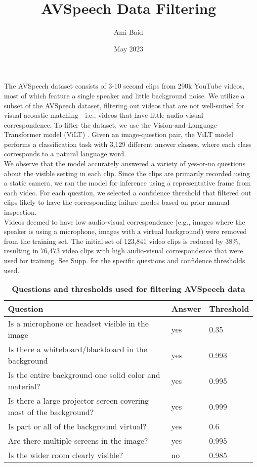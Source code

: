 \documentclass{article}
\title{\textbf{AVSpeech Data Filtering}}
\author{Ami Baid}
\date{May 2023}
\begin{document}
\maketitle

\begin{flushleft}
    \large
    The AVSpeech dataset \cite{DBLP:journals/corr/abs-1804-03619} consists of 3-10 second clips from 290k YouTube videos, most of which feature a single speaker and little background noise. We utilize a subset of the AVSpeech dataset, filtering out videos that are not well-suited for visual acoustic matching—i.e., videos that have little audio-visual correspondence. To filter the dataset, we use the Vision-and-Language Transformer model (ViLT) \cite{kim2021vilt}. Given an image-question pair, the ViLT model performs a classification task with 3,129 different answer classes, where each class corresponds to a natural language word. \\
    We observe that the model accurately answered a variety of yes-or-no questions about the visible setting in each clip. Since the clips are primarily recorded using a static camera, we ran the model for inference using a representative frame from each video. For each question, we selected a confidence threshold that filtered out clips likely to have the corresponding failure modes based on prior manual inspection. \\
    Videos deemed to have low audio-visual correspondence (e.g., images where the speaker is using a microphone, images with a virtual background) were removed from the training set. The initial set of 123,841 video clips is reduced by 38\%, resulting in 76,473 video clips with high audio-visual correspondence that were used for training. See Supp. for the specific questions and confidence thresholds used. 
\end{flushleft}

\pagebreak

\begin{center}
\begin{table}
\centering
\caption{\textbf{Questions and thresholds used for filtering AVSpeech data}}
\begin{tabular}{m{6.5cm}|m{2cm}|m{2cm}} 
    \hline
    Question & Answer & Threshold\\
    \hline
    Is a microphone or headset visible in the image & yes & 0.35\\
    \hline
    Is there a whiteboard/blackboard in the background & yes & 0.993\\
    \hline
    Is the entire background one solid color and material? & yes & 0.995\\
    \hline
    Is there a large projector screen covering most of the background? & yes & 0.999\\
    \hline
    Is part or all of the background virtual? & yes & 0.6\\
    \hline
    Are there multiple screens in the image? & yes & 0.995\\
    \hline
    Is the wider room clearly visible? & no & 0.985\\
    \hline
\end{tabular}
\end{table}
\end{center}

\pagebreak


\end{document}
